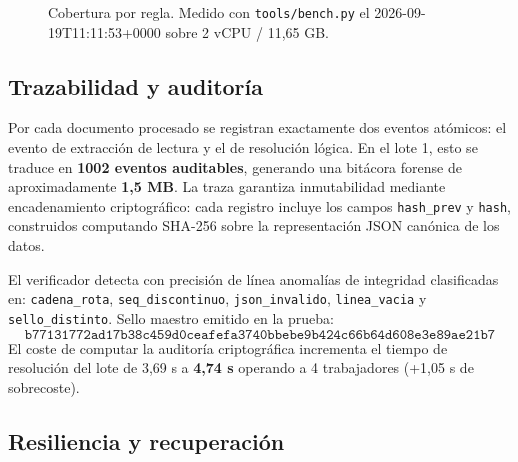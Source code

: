 \documentclass[11pt,a4paper]{article}
\begin{document}
\begin{figure}[htbp]
\centering
{}
\caption{Cobertura por regla. Medido con \texttt{tools/bench.py} el 2026-09-19T11:11:53+0000 sobre 2 vCPU / 11,65 GB.}
\end{figure}

\subsection{Trazabilidad y auditoría}
Por cada documento procesado se registran exactamente dos eventos atómicos: el evento de extracción de lectura y el de resolución lógica. En el lote 1, esto se traduce en \textbf{1002 eventos auditables}, generando una bitácora forense de aproximadamente \textbf{1,5 MB}. La traza garantiza inmutabilidad mediante encadenamiento criptográfico: cada registro incluye los campos \texttt{hash\_prev} y \texttt{hash}, construidos computando SHA-256 sobre la representación JSON canónica de los datos.

El verificador detecta con precisión de línea anomalías de integridad clasificadas en: \texttt{cadena\_rota}, \texttt{seq\_discontinuo}, \texttt{json\_invalido}, \texttt{linea\_vacia} y \texttt{sello\_distinto}. Sello maestro emitido en la prueba:
$$\texttt{b77131772ad17b38c459d0ceafefa3740bbebe9b424c66b64d608e3e89ae21b7}$$
El coste de computar la auditoría criptográfica incrementa el tiempo de resolución del lote de 3,69 s a \textbf{4,74 s} operando a 4 trabajadores (+1,05 s de sobrecoste).

\subsection{Resiliencia y recuperación}
\end{document}
